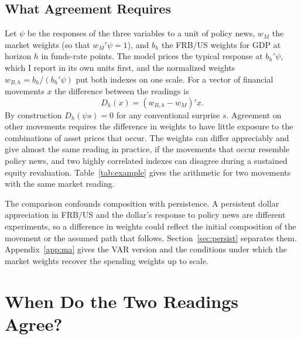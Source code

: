 \documentclass[11pt]{article}
\begin{document}

\FloatBarrier


\subsection{What Agreement Requires}\label{sec:requires}
Let $\psi$ be the responses of the three variables to a unit of policy news, $w_M$ the market weights (so that $w_M'\psi=1$), and $b_h$ the FRB/US weights for GDP at horizon $h$ in funds-rate points. The model prices the typical response at $b_h'\psi$, which I report in its own units first, and the normalized weights $w_{B,h}=b_h/(b_h'\psi)$ put both indexes on one scale. For a vector of financial movements $x$ the difference between the readings is
\[
D_h(x)=(w_{B,h}-w_M)'x.
\]
By construction $D_h(\psi s)=0$ for any conventional surprise $s$. Agreement on other movements requires the difference in weights to have little exposure to the combinations of asset prices that occur. The weights can differ appreciably and give almost the same reading in practice, if the movements that occur resemble policy news, and two highly correlated indexes can disagree during a sustained equity revaluation. Table~\ref{tab:example} gives the arithmetic for two movements with the same market reading.



The comparison confounds composition with persistence. A persistent dollar appreciation in FRB/US and the dollar's response to policy news are different experiments, so a difference in weights could reflect the initial composition of the movement or the assumed path that follows. Section~\ref{sec:persist} separates them. Appendix~\ref{app:ma} gives the VAR version and the conditions under which the market weights recover the spending weights up to scale.
\FloatBarrier

\section{When Do the Two Readings Agree?}\label{sec:agree}
\end{document}

